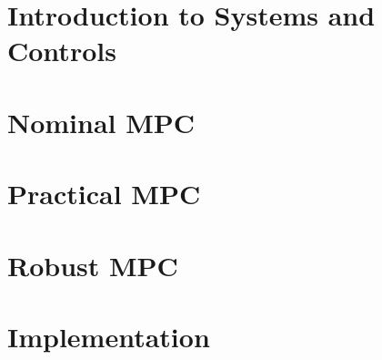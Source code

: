 \documentclass[layout=summary, columns=4,secnumdepth=4,tight]{sst-custom}
\begin{document}
\iftoggle{do-multicol}{ \begin{multicols*}{\numcolumns}}{}
		
		\iftoggle{use-small-font}{\footnotesize}{}
		\renewcommand{\contentsname}{}
		\vspace{-10mm}
		\tableofcontents
		\vfill\null
		\columnbreak
		\section{Introduction to Systems and Controls}
		
		
		
		
		
		
		
		
		\section{Nominal MPC}
		
		\section{Practical MPC}
		
		\section{Robust MPC}
		
		\section{Implementation}
		
		\iftoggle{do-multicol}{\end{multicols*}}{}
\end{document}
